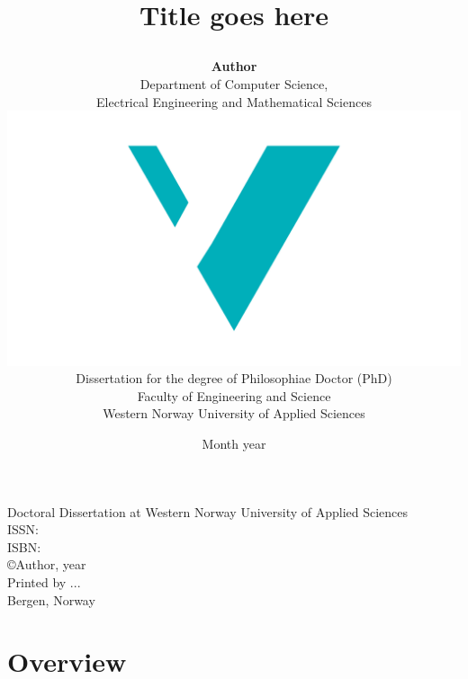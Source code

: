 \documentclass[10pt]{book}
\title{
{\fontsize{28}{30}\usefont{OT1}{phv}{bc}{n}\selectfont Title goes here}
	\author{
	\textbf{Author}\vspace{1cm}\\
		Department of Computer Science, \\ 
		Electrical Engineering and Mathematical Sciences \vspace{1cm}\\
		\includegraphics[scale=0.36]{logos/logo.pdf}\vspace{2em}\\
		Dissertation for the degree of Philosophiae Doctor (PhD)\vspace{0.5em}\\
		Faculty of Engineering and Science \vspace{0.3cm}\\
		Western Norway University of Applied Sciences
	}
	\date{Month year}
}
\begin{document}

\ifDownscaledFinalDoc
	\fontsize{\TextSize}{\BaseLineSkip}
	\selectfont
\fi

\ifDraft
	\doublespacing
\fi


\maketitle
\normalsize\vspace*{15cm}
\begin{minipage}{13cm}
Doctoral Dissertation at Western Norway University of Applied Sciences\\
ISSN: \\ %
ISBN: \\[2ex] %
\copyright{Author}, year\\[2ex] %
Printed by ...\\
Bergen, Norway
\end{minipage}

\frontmatter






\tableofcontents
\mainmatter

%
%
\part{Overview}
\label{part:1}



%
%
%
%


\end{document}
